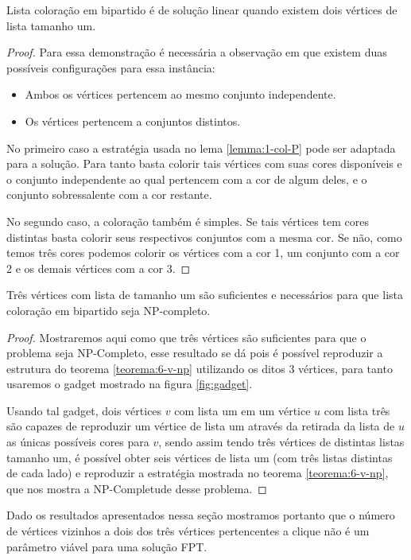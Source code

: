 \begin{teorema}
 Lista coloração em bipartido é de solução linear quando existem dois vértices de lista tamanho um.
\end{teorema}
\begin{proof}
 Para essa demonstração é necessária a observação em que existem duas possíveis configurações para essa instância:
 \begin{itemize}
   \item Ambos os vértices pertencem ao mesmo conjunto independente.
   \item Os vértices pertencem a conjuntos distintos.
 \end{itemize} 
 No primeiro caso a estratégia usada no lema \ref{lemma:1-col-P} pode ser adaptada para a solução. Para tanto basta colorir tais vértices com suas cores disponíveis e o conjunto independente ao qual pertencem com a cor de algum deles, e o conjunto sobressalente com a cor restante.
 
 No segundo caso, a coloração também é simples. Se tais vértices tem cores distintas basta colorir seus respectivos conjuntos com a mesma cor. Se não, como temos três cores podemos colorir os vértices com a cor 1, um conjunto com a cor 2 e os demais vértices com a cor 3.  
\end{proof}

\begin{teorema}
  Três vértices com lista de tamanho um são suficientes e necessários para que lista coloração em bipartido seja NP-completo.
\end{teorema}
\begin{proof}
  Mostraremos aqui como que três vértices são suficientes para que o problema seja NP-Completo, esse resultado se dá pois é possível reproduzir a estrutura do teorema \ref{teorema:6-v-np} utilizando os ditos 3 vértices, para tanto usaremos o gadget mostrado na figura \ref{fig:gadget}.

Usando tal gadget, dois vértices $v$ com lista um em um vértice $u$ com lista três são capazes de reproduzir um vértice de lista um através da retirada da lista de $u$ as únicas possíveis cores para $v$, sendo assim tendo três vértices de distintas listas tamanho um, é possível obter seis vértices de lista um (com três listas distintas de cada lado) e reproduzir a estratégia mostrada no teorema \ref{teorema:6-v-np}, que nos mostra a NP-Completude desse problema.
  
\end{proof}
 Dado os resultados apresentados nessa seção mostramos portanto que o número de vértices vizinhos a dois dos três vértices pertencentes a clique não é um parâmetro viável para uma solução FPT.
  
